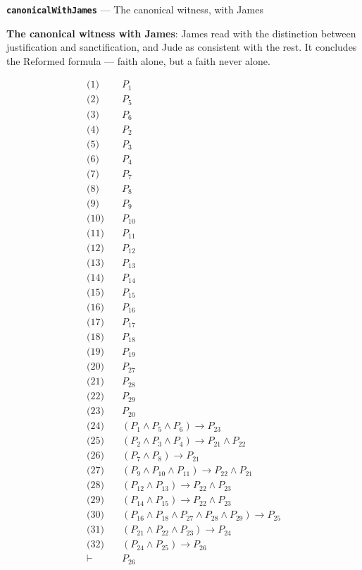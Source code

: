 \documentclass[11pt]{article}
\begin{document}
\par\medskip\noindent\textbf{\texttt{canonical\allowbreak{}With\allowbreak{}James}} --- The canonical witness, with James\par\nobreak\noindent
\textbf{The canonical witness with James}: James read with the distinction between justification and sanctification, and Jude as consistent with the rest. It concludes the Reformed formula — faith alone, but a faith never alone.

\begin{align*}
  \text{(1)} \quad & P_{1} \\
  \text{(2)} \quad & P_{5} \\
  \text{(3)} \quad & P_{6} \\
  \text{(4)} \quad & P_{2} \\
  \text{(5)} \quad & P_{3} \\
  \text{(6)} \quad & P_{4} \\
  \text{(7)} \quad & P_{7} \\
  \text{(8)} \quad & P_{8} \\
  \text{(9)} \quad & P_{9} \\
  \text{(10)} \quad & P_{10} \\
  \text{(11)} \quad & P_{11} \\
  \text{(12)} \quad & P_{12} \\
  \text{(13)} \quad & P_{13} \\
  \text{(14)} \quad & P_{14} \\
  \text{(15)} \quad & P_{15} \\
  \text{(16)} \quad & P_{16} \\
  \text{(17)} \quad & P_{17} \\
  \text{(18)} \quad & P_{18} \\
  \text{(19)} \quad & P_{19} \\
  \text{(20)} \quad & P_{27} \\
  \text{(21)} \quad & P_{28} \\
  \text{(22)} \quad & P_{29} \\
  \text{(23)} \quad & P_{20} \\
  \text{(24)} \quad & (P_{1} \land P_{5} \land P_{6}) \rightarrow P_{23} \\
  \text{(25)} \quad & (P_{2} \land P_{3} \land P_{4}) \rightarrow P_{21} \land P_{22} \\
  \text{(26)} \quad & (P_{7} \land P_{8}) \rightarrow P_{21} \\
  \text{(27)} \quad & (P_{9} \land P_{10} \land P_{11}) \rightarrow P_{22} \land P_{21} \\
  \text{(28)} \quad & (P_{12} \land P_{13}) \rightarrow P_{22} \land P_{23} \\
  \text{(29)} \quad & (P_{14} \land P_{15}) \rightarrow P_{22} \land P_{23} \\
  \text{(30)} \quad & (P_{16} \land P_{18} \land P_{27} \land P_{28} \land P_{29}) \rightarrow P_{25} \\
  \text{(31)} \quad & (P_{21} \land P_{22} \land P_{23}) \rightarrow P_{24} \\
  \text{(32)} \quad & (P_{24} \land P_{25}) \rightarrow P_{26} \\
  \vdash \quad & P_{26}
\end{align*}
\end{document}
